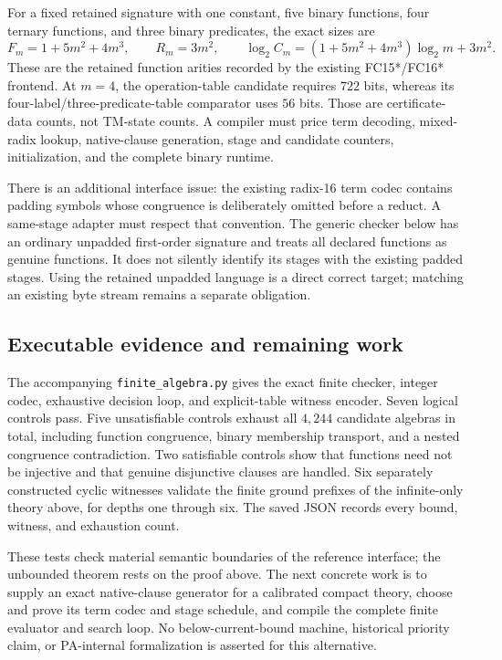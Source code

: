 For a fixed retained signature with one constant, five binary functions,
four ternary functions, and three binary predicates, the exact sizes are
\[
 F_m=1+5m^2+4m^3,\qquad R_m=3m^2,
 \qquad \log_2 C_m=(1+5m^2+4m^3)\log_2m+3m^2.
\]
These are the retained function arities recorded by the existing FC15*/FC16*
frontend.  At $m=4$, the operation-table candidate requires $722$ bits,
whereas its four-label/three-predicate-table comparator uses $56$ bits.
Those are certificate-data counts, not TM-state counts.  A compiler must
price term decoding, mixed-radix lookup, native-clause generation, stage and
candidate counters, initialization, and the complete binary runtime.

There is an additional interface issue: the existing radix-16 term codec
contains padding symbols whose congruence is deliberately omitted before a
reduct.  A same-stage adapter must respect that convention.  The generic
checker below has an ordinary unpadded first-order signature and treats all
declared functions as genuine functions.  It does not silently identify its
stages with the existing padded stages.  Using the retained unpadded language
is a direct correct target; matching an existing byte stream remains a
separate obligation.

\subsection{Executable evidence and remaining work}

The accompanying \texttt{finite\_algebra.py} gives the exact finite checker,
integer codec, exhaustive decision loop, and explicit-table witness encoder.
Seven logical controls pass.  Five unsatisfiable controls exhaust all $4{,}244$
candidate algebras in total, including function congruence, binary membership
transport, and a nested congruence contradiction.  Two satisfiable controls
show that functions need not be injective and that genuine disjunctive clauses
are handled.  Six separately constructed cyclic witnesses validate the
finite ground prefixes of the infinite-only theory above, for depths one
through six.  The saved JSON records every bound, witness, and exhaustion
count.


These tests check material semantic boundaries of the reference interface;
the unbounded theorem rests on the proof above.  The next concrete work is
to supply an exact native-clause generator for a calibrated compact theory,
choose and prove its term codec and stage schedule, and compile the complete
finite evaluator and search loop.  No below-current-bound machine, historical
priority claim, or PA-internal formalization is asserted for this alternative.
